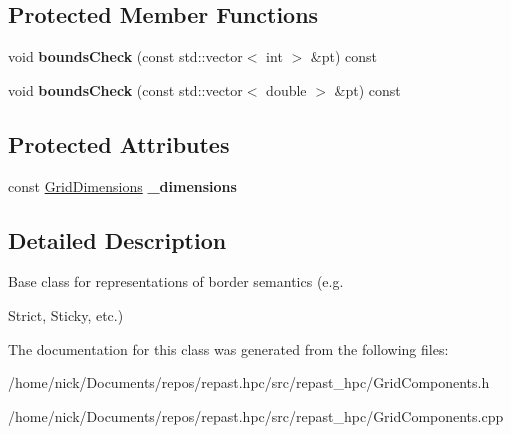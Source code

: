 \subsection*{Protected Member Functions}
\begin{DoxyCompactItemize}
\item 
\hypertarget{classrepast_1_1_borders_a66336724557f7040d1240b771be1362a}{void {\bfseries bounds\-Check} (const std\-::vector$<$ int $>$ \&pt) const }\label{classrepast_1_1_borders_a66336724557f7040d1240b771be1362a}

\item 
\hypertarget{classrepast_1_1_borders_a9e364b71465c459a638551c40653440a}{void {\bfseries bounds\-Check} (const std\-::vector$<$ double $>$ \&pt) const }\label{classrepast_1_1_borders_a9e364b71465c459a638551c40653440a}

\end{DoxyCompactItemize}
\subsection*{Protected Attributes}
\begin{DoxyCompactItemize}
\item 
\hypertarget{classrepast_1_1_borders_a1e0e3961f4312901cd1c4909d6647cea}{const \hyperlink{classrepast_1_1_grid_dimensions}{Grid\-Dimensions} {\bfseries \-\_\-dimensions}}\label{classrepast_1_1_borders_a1e0e3961f4312901cd1c4909d6647cea}

\end{DoxyCompactItemize}


\subsection{Detailed Description}
Base class for representations of border semantics (e.\-g. 

Strict, Sticky, etc.) 

The documentation for this class was generated from the following files\-:\begin{DoxyCompactItemize}
\item 
/home/nick/\-Documents/repos/repast.\-hpc/src/repast\-\_\-hpc/Grid\-Components.\-h\item 
/home/nick/\-Documents/repos/repast.\-hpc/src/repast\-\_\-hpc/Grid\-Components.\-cpp\end{DoxyCompactItemize}
